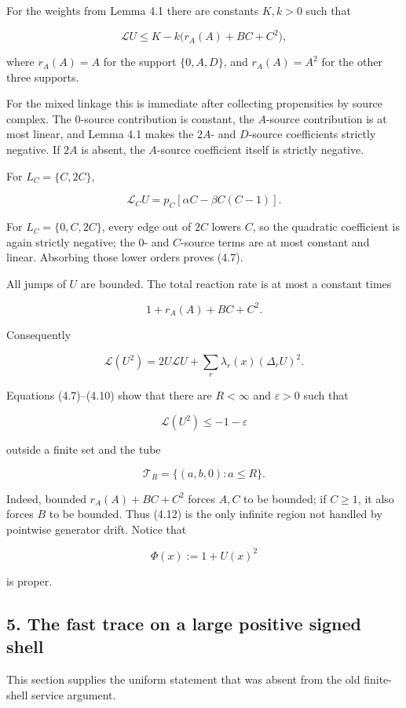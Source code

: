 For the weights from Lemma 4.1 there are constants \(K,k>0\) such that

\[
 \mathcal LU\le K-k\bigl(r_A(A)+BC+C^2\bigr),
\tag{4.7}
\]

where \(r_A(A)=A\) for the support \(\{0,A,D\}\), and \(r_A(A)=A^2\) for
the other three supports.

For the mixed linkage this is immediate after collecting propensities by
source complex. The \(0\)-source contribution is constant, the
\(A\)-source contribution is at most linear, and Lemma 4.1 makes the
\(2A\)- and \(D\)-source coefficients strictly negative. If \(2A\) is
absent, the \(A\)-source coefficient itself is strictly negative.

For \(L_C=\{C,2C\}\),

\[
 \mathcal L_CU=p_C[\alpha C-\beta C(C-1)].
\tag{4.8}
\]

For \(L_C=\{0,C,2C\}\), every edge out of \(2C\) lowers \(C\), so the
quadratic coefficient is again strictly negative; the \(0\)- and
\(C\)-source terms are at most constant and linear. Absorbing those
lower orders proves (4.7).

All jumps of \(U\) are bounded. The total reaction rate is at most a
constant times

\[
 1+r_A(A)+BC+C^2.
\tag{4.9}
\]

Consequently

\[
 \mathcal L(U^2)
 =2U\mathcal LU+
   \sum_r\lambda_r(x)(\Delta_rU)^2.
\tag{4.10}
\]

Equations (4.7)--(4.10) show that there are \(R<\infty\) and
\(\varepsilon>0\) such that

\[
 \mathcal L(U^2)\le-1-\varepsilon
\tag{4.11}
\]

outside a finite set and the tube

\[
 \mathcal T_R=\{(a,b,0):a\le R\}.
\tag{4.12}
\]

Indeed, bounded \(r_A(A)+BC+C^2\) forces \(A,C\) to be bounded; if
\(C\ge1\), it also forces \(B\) to be bounded. Thus (4.12) is the only
infinite region not handled by pointwise generator drift. Notice that

\[
 \Phi(x):=1+U(x)^2
\tag{4.13}
\]

is proper.

\subsection{5. The fast trace on a large positive signed
shell}

This section supplies the uniform statement that was absent from the old
finite-shell service argument.

